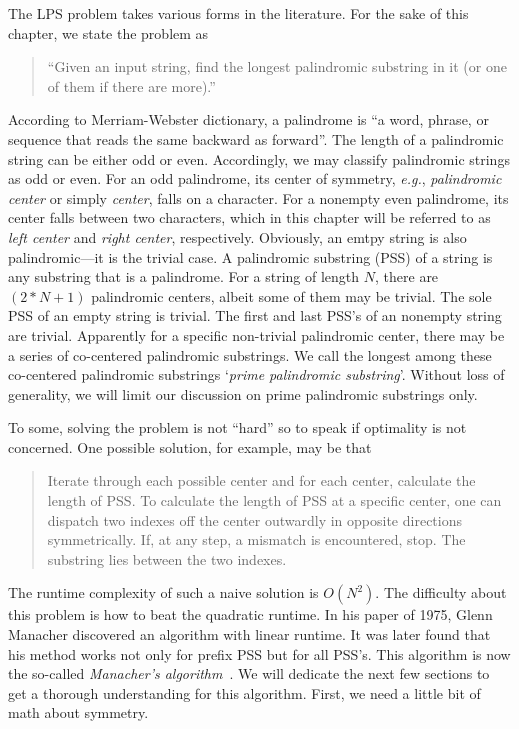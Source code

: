 The LPS problem takes various forms in the literature.
For the sake of this chapter, we state the problem as
\begin{quote}
    ``Given an input string, find the longest palindromic substring in it (or one of them if
    there are more).''
\end{quote}
According to Merriam-Webster dictionary, a palindrome is ``a word, phrase, or sequence that reads
the same backward as forward''.
The length of a palindromic string can be either odd or even.
Accordingly, we may classify palindromic strings as odd or even.
For an odd palindrome, its center of symmetry, \textit{e.g.}, \emph{palindromic center}
or simply \emph{center}, falls on a character.
For a nonempty even palindrome, its center falls between two characters, which in this chapter
will be referred to as \emph{left center} and \emph{right center}, respectively.
Obviously, an emtpy string is also palindromic---it is the trivial case.
A palindromic substring (PSS) of a string is any substring that is a palindrome.
For a string of length $N$, there are $(2 * N + 1)$ palindromic centers, albeit some of
them may be trivial.
The sole PSS of an empty string is trivial.
The first and last PSS's of an nonempty string are trivial.
Apparently for a specific non-trivial palindromic center, there may be a series of co-centered
palindromic substrings.
We call the longest among these co-centered palindromic substrings
`\textit{prime palindromic substring}'.
Without loss of generality, we will limit our discussion on prime palindromic substrings only.


To some, solving the problem is not ``hard'' so to speak if optimality is not concerned.
One possible solution, for example, may be that
\begin{quotation}
    Iterate through each possible center and for each center, calculate the length of PSS\@.
    To calculate the length of PSS at a specific center, one can dispatch two indexes off the center
    outwardly in opposite directions symmetrically.
    If, at any step, a mismatch is encountered, stop.
    The substring lies between the two indexes.
\end{quotation}
The runtime complexity of such a naive solution is $O(N^2)$.
The difficulty about this problem is how to beat the quadratic runtime.
In his paper of 1975, Glenn Manacher discovered an algorithm with linear runtime.
It was later found that his method works not only for prefix PSS but for all PSS's.
This algorithm is now the so-called \textit{Manacher's algorithm}~\cite{Manacher:1975}.
We will dedicate the next few sections to get a thorough understanding for this algorithm.
First, we need a little bit of math about symmetry.


